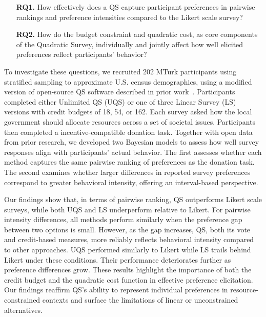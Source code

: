 \begin{itemize}
    \item [\textbf{RQ1.}] How effectively does a QS capture participant preferences in pairwise rankings and preference intensities compared to the Likert scale survey?
    \item [\textbf{RQ2.}] How do the budget constraint and quadratic cost, as core components of the Quadratic Survey, individually and jointly affect how well elicited preferences reflect participants' behavior?
\end{itemize}


To investigate these questions, we recruited 202 MTurk participants using stratified sampling to approximate U.S. census demographics, using a modified version of open-source QS software described in prior work~\cite{chengCanShowWhat2021}. Participants completed either Unlimited QS (UQS) or one of three Linear Survey (LS) versions with credit budgets of 18, 54, or 162. Each survey asked how the local government should allocate resources across a set of societal issues. Participants then completed a incentive-compatible donation task. Together with open data from prior research, we developed two Bayesian models to assess how well survey responses align with participants' actual behavior. The first assesses whether each method captures the same pairwise ranking of preferences as the donation task. The second examines whether larger differences in reported survey preferences correspond to greater behavioral intensity, offering an interval-based perspective.

Our findings show that, in terms of pairwise ranking, QS outperforms Likert scale surveys, while both UQS and LS underperform relative to Likert. For pairwise intensity differences, all methods perform similarly when the preference gap between two options is small. However, as the gap increases, QS, both its vote and credit-based measures, more reliably reflects behavioral intensity compared to other approaches. UQS performed similarly to Likert while LS trails behind Likert under these conditions. Their performance deteriorates further as preference differences grow. These results highlight the importance of both the credit budget and the quadratic cost function in effective preference elicitation. Our findings reaffirm QS's ability to represent individual preferences in resource-constrained contexts and surface the limitations of linear or unconstrained alternatives.

